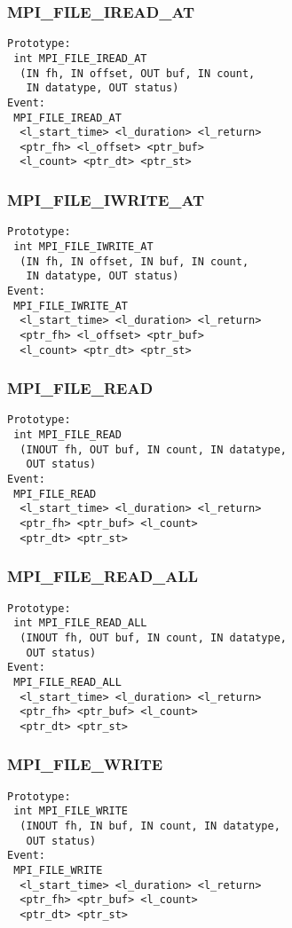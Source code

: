 \documentclass{article}
\begin{document}
\subsubsection{MPI\_FILE\_IREAD\_AT}
\label{sec:MPIFILEIREADAT}
\begin{verbatim}
Prototype:
 int MPI_FILE_IREAD_AT
  (IN fh, IN offset, OUT buf, IN count, 
   IN datatype, OUT status)
Event:
 MPI_FILE_IREAD_AT 
  <l_start_time> <l_duration> <l_return>
  <ptr_fh> <l_offset> <ptr_buf>
  <l_count> <ptr_dt> <ptr_st>
\end{verbatim}

\subsubsection{MPI\_FILE\_IWRITE\_AT}
\label{sec:MPIFILEIWRITEAT}
\begin{verbatim}
Prototype:
 int MPI_FILE_IWRITE_AT
  (IN fh, IN offset, IN buf, IN count, 
   IN datatype, OUT status)
Event:
 MPI_FILE_IWRITE_AT 
  <l_start_time> <l_duration> <l_return>
  <ptr_fh> <l_offset> <ptr_buf>
  <l_count> <ptr_dt> <ptr_st>
\end{verbatim}

\subsubsection{MPI\_FILE\_READ}
\label{sec:MPIFILEREAD}
\begin{verbatim}
Prototype:
 int MPI_FILE_READ
  (INOUT fh, OUT buf, IN count, IN datatype, 
   OUT status)
Event:
 MPI_FILE_READ 
  <l_start_time> <l_duration> <l_return>
  <ptr_fh> <ptr_buf> <l_count>
  <ptr_dt> <ptr_st>
\end{verbatim}

\subsubsection{MPI\_FILE\_READ\_ALL}
\label{sec:MPIFILEREADALL}
\begin{verbatim}
Prototype:
 int MPI_FILE_READ_ALL
  (INOUT fh, OUT buf, IN count, IN datatype, 
   OUT status)
Event:
 MPI_FILE_READ_ALL 
  <l_start_time> <l_duration> <l_return>
  <ptr_fh> <ptr_buf> <l_count>
  <ptr_dt> <ptr_st>
\end{verbatim}

\subsubsection{MPI\_FILE\_WRITE}
\label{sec:MPIFILEWRITE}
\begin{verbatim}
Prototype:
 int MPI_FILE_WRITE
  (INOUT fh, IN buf, IN count, IN datatype, 
   OUT status)
Event:
 MPI_FILE_WRITE 
  <l_start_time> <l_duration> <l_return>
  <ptr_fh> <ptr_buf> <l_count>
  <ptr_dt> <ptr_st>
\end{verbatim}
\end{document}
